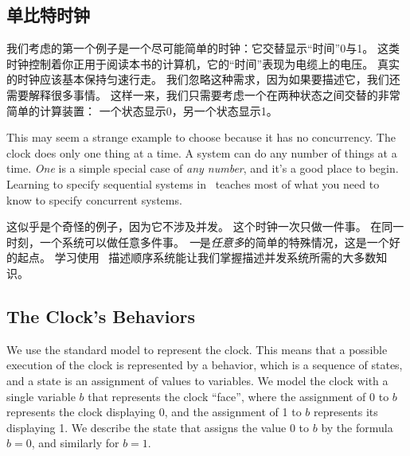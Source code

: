\documentclass[fleqn,leqno]{article}
\begin{document}
\begin{ch}
\newpage
 \vspace{-\baselineskip}%
\section{单比特时钟}

我们考虑的第一个例子是一个尽可能简单的时钟：它交替显示``时间''0与1。
这类时钟控制着你正用于阅读本书的计算机，它的``时间''表现为电缆上的电压。
真实的时钟应该基本保持匀速行走。
我们忽略这种需求，因为如果要描述它，我们还需要解释很多事情。
这样一来，我们只需要考虑一个在两种状态之间交替的非常简单的计算装置：
一个状态显示0，另一个状态显示1。
\end{ch}

\begin{en}
This may seem a strange example to choose because it has no
concurrency.  The clock does only one thing at a time.  A system can
do any number of things at a time.  \emph{One} is a simple special
case of \emph{any number}, and it's a good place to begin.  Learning
to specify sequential systems in \tlaplus\ teaches most of what you
need to know to specify concurrent systems.
\end{en}

\begin{ch}
  这似乎是个奇怪的例子，因为它不涉及并发。
  这个时钟一次只做一件事。
  在同一时刻，一个系统可以做任意多件事。
  \emph{一}是\emph{任意多}的简单的特殊情况，这是一个好的起点。
  学习使用 \tlaplus\ 描述顺序系统能让我们掌握描述并发系统所需的大多数知识。
\end{ch}


\begin{en}
\subsection{The Clock's Behaviors} \label{sec2.1}

We use the standard model to represent the clock.  This means that a
possible execution of the clock is represented by a 
behavior, which is
a sequence of states, and a 
state is an assignment of values to variables.  We model the clock
with a single variable $b$ that represents the clock ``face'', where
the assignment of 0 to $b$ represents the clock displaying 0, and the
assignment of 1 to $b$ represents its displaying 1.  We describe the
state that assigns the value 0 to $b$ by the formula $b=0$, and
similarly for $b=1$.
\end{en}
\end{document}
